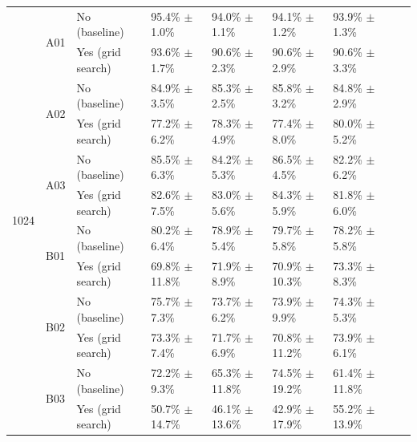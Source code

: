 \begin{table}[H]
\begin{tabular}{lllllllll}
            \multirow{12}{*}{1024} & \multirow{2}{*}{A01} & No (baseline) & 95.4\% $\pm$ 1.0\% & 94.0\% $\pm$ 1.1\% & 94.1\% $\pm$ 1.2\% & 93.9\% $\pm$ 1.3\% \\
            & & Yes (grid search) & 93.6\% $\pm$ 1.7\% & 90.6\% $\pm$ 2.3\% & 90.6\% $\pm$ 2.9\% & 90.6\% $\pm$ 3.3\% \\
            \cmidrule{2-7}
            & \multirow{2}{*}{A02} & No (baseline) & 84.9\% $\pm$ 3.5\% & 85.3\% $\pm$ 2.5\% & 85.8\% $\pm$ 3.2\% & 84.8\% $\pm$ 2.9\% \\
            & & Yes (grid search) & 77.2\% $\pm$ 6.2\% & 78.3\% $\pm$ 4.9\% & 77.4\% $\pm$ 8.0\% & 80.0\% $\pm$ 5.2\% \\
            \cmidrule{2-7}
            & \multirow{2}{*}{A03} & No (baseline) & 85.5\% $\pm$ 6.3\% & 84.2\% $\pm$ 5.3\% & 86.5\% $\pm$ 4.5\% & 82.2\% $\pm$ 6.2\% \\
            & & Yes (grid search) & 82.6\% $\pm$ 7.5\% & 83.0\% $\pm$ 5.6\% & 84.3\% $\pm$ 5.9\% & 81.8\% $\pm$ 6.0\% \\
            \cmidrule{2-7}
            & \multirow{2}{*}{B01} & No (baseline) & 80.2\% $\pm$ 6.4\% & 78.9\% $\pm$ 5.4\% & 79.7\% $\pm$ 5.8\% & 78.2\% $\pm$ 5.8\% \\
            & & Yes (grid search) & 69.8\% $\pm$ 11.8\% & 71.9\% $\pm$ 8.9\% & 70.9\% $\pm$ 10.3\% & 73.3\% $\pm$ 8.3\% \\
            \cmidrule{2-7}
            & \multirow{2}{*}{B02} & No (baseline) & 75.7\% $\pm$ 7.3\% & 73.7\% $\pm$ 6.2\% & 73.9\% $\pm$ 9.9\% & 74.3\% $\pm$ 5.3\% \\
            & & Yes (grid search) & 73.3\% $\pm$ 7.4\% & 71.7\% $\pm$ 6.9\% & 70.8\% $\pm$ 11.2\% & 73.9\% $\pm$ 6.1\% \\
            \cmidrule{2-7}
            & \multirow{2}{*}{B03} & No (baseline) & 72.2\% $\pm$ 9.3\% & 65.3\% $\pm$ 11.8\% & 74.5\% $\pm$ 19.2\% & 61.4\% $\pm$ 11.8\% \\
            & & Yes (grid search) & 50.7\% $\pm$ 14.7\% & 46.1\% $\pm$ 13.6\% & 42.9\% $\pm$ 17.9\% & 55.2\% $\pm$ 13.9\% \\

        \bottomrule

    \end{tabular}
\end{table}


